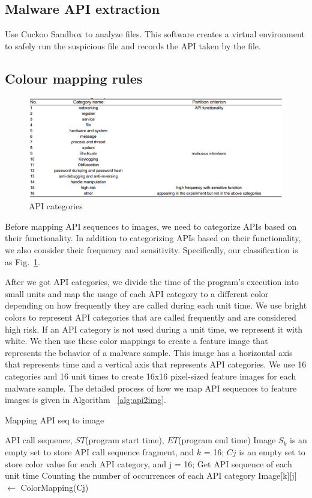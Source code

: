 \documentclass{article}
\begin{document}
\subsection{Malware API extraction}
Use Cuckoo Sandbox to analyze files. This software creates a virtual environment to safely run the suspicious file and records the API taken by the file.
\subsection{Colour mapping rules}
\begin{figure}
    \centering
    \includegraphics[width=1\textwidth]{fig/API CAT.png}
    \caption{API categories}
    \label{fig:apicat}
\end{figure}
Before mapping API sequences to images, we need to categorize APIs based on their functionality. In addition to categorizing APIs based on their functionality, we also consider their frequency and sensitivity.
Specifically, our classification is as Fig.~\ref{fig:apicat}.

After we got API categories, we divide the time of the program's execution into small units and map the usage of each API category to a different color depending on how frequently they are called during each unit time. We use bright colors to represent API categories that are called frequently and are considered high risk. If an API category is not used during a unit time, we represent it with white. We then use these color mappings to create a feature image that represents the behavior of a malware sample. This image has a horizontal axis that represents time and a vertical axis that represents API categories. We use 16 categories and 16 unit times to create 16x16 pixel-sized feature images for each malware sample. The detailed process of how we map API sequences to feature images is given in Algorithm ~\ref{alg:api2img}.

\begin{algorithm}
\caption{Mapping API seq to image}
\label{alg:api2img}
\begin{algorithmic}[1]
\Require API call sequence, $ST$(program start time), $ET$(program end time)
\Ensure Image
\State $S_k$ is an empty set to store API call sequence fragment, and $k$ = 16;
\State $Cj$ is an empty set to store color value for each API category, and j = 16;
\State Get API sequence of each unit time
    \State Counting the number of occurrences of each API category
        \State Image[k][j] $\leftarrow$ ColorMapping(Cj)
    \EndFor
\EndFor
\end{algorithmic}
\end{algorithm}
\end{document}
